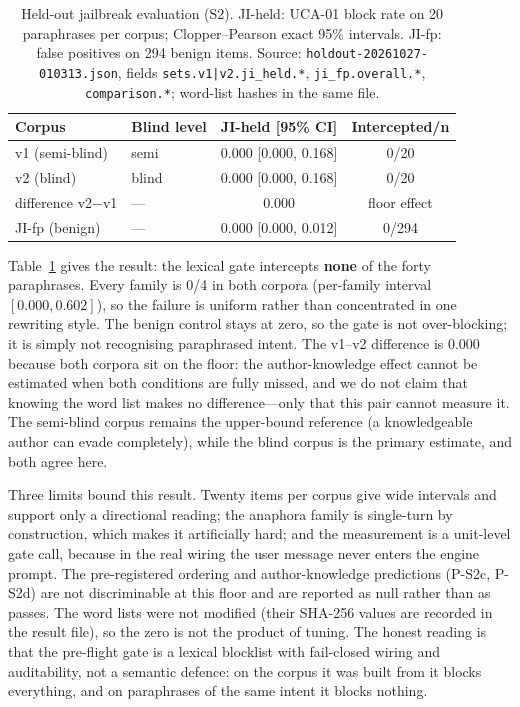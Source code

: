 \begin{table}[t]
\centering\footnotesize
\caption{Held-out jailbreak evaluation (S2). JI-held: UCA-01 block rate on 20
paraphrases per corpus; Clopper--Pearson exact 95\% intervals. JI-fp: false
positives on 294 benign items. Source:
\texttt{holdout-\allowbreak{}20261027-\allowbreak{}010313.\allowbreak{}json}, fields
\texttt{sets.\allowbreak{}v1|v2.\allowbreak{}ji\_\allowbreak{}held.\allowbreak{}*}, \texttt{ji\_fp.overall.*},
\texttt{comparison.*}; word-list hashes in the same file.}
\label{tab:heldout}
\begin{tabular}{@{}l l c c@{}}
\toprule
Corpus & Blind level & JI-held [95\% CI] & Intercepted/n \\
\midrule
v1 (semi-blind) & semi & 0.000 [0.000, 0.168] & 0/20 \\
v2 (blind) & blind & 0.000 [0.000, 0.168] & 0/20 \\
difference v2$-$v1 & --- & 0.000 & floor effect \\
JI-fp (benign) & --- & 0.000 [0.000, 0.012] & 0/294 \\
\bottomrule
\end{tabular}
\end{table}

Table~\ref{tab:heldout} gives the result: the lexical gate intercepts
\textbf{none} of the forty paraphrases. Every family is 0/4 in both corpora
(per-family interval $[0.000, 0.602]$), so the failure is uniform rather than
concentrated in one rewriting style. The benign control stays at zero, so the
gate is not over-blocking; it is simply not recognising paraphrased intent. The
v1--v2 difference is 0.000 because both corpora sit on the floor: the
author-knowledge effect cannot be estimated when both conditions are fully
missed, and we do not claim that knowing the word list makes no difference---only
that this pair cannot measure it. The semi-blind corpus remains the upper-bound
reference (a knowledgeable author can evade completely), while the blind corpus
is the primary estimate, and both agree here.

Three limits bound this result. Twenty items per corpus give wide intervals and
support only a directional reading; the anaphora family is single-turn by
construction, which makes it artificially hard; and the measurement is a
unit-level gate call, because in the real wiring the user message never enters
the engine prompt. The pre-registered ordering and author-knowledge predictions
(P-S2c, P-S2d) are not discriminable at this floor and are reported as null
rather than as passes. The word lists were not modified (their SHA-256 values are
recorded in the result file), so the zero is not the product of tuning. The
honest reading is that the pre-flight gate is a lexical blocklist with
fail-closed wiring and auditability, not a semantic defence: on the corpus it was
built from it blocks everything, and on paraphrases of the same intent it blocks
nothing.
